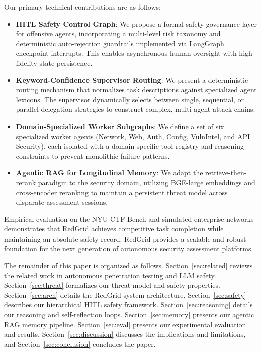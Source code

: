 \documentclass[conference,compsoc]{IEEEtran}
\begin{document}
Our primary technical contributions are as follows:
\begin{itemize}
    \item \textbf{HITL Safety Control Graph}: We propose a formal safety governance layer for offensive agents, incorporating a multi-level risk taxonomy and deterministic auto-rejection guardrails implemented via LangGraph checkpoint interrupts. This enables asynchronous human oversight with high-fidelity state persistence.
    
    \item \textbf{Keyword-Confidence Supervisor Routing}: We present a deterministic routing mechanism that normalizes task descriptions against specialized agent lexicons. The supervisor dynamically selects between single, sequential, or parallel delegation strategies to construct complex, multi-agent attack chains.

    \item \textbf{Domain-Specialized Worker Subgraphs}: We define a set of six specialized worker agents (Network, Web, Auth, Config, VulnIntel, and API Security), each isolated with a domain-specific tool registry and reasoning constraints to prevent monolithic failure patterns.

    \item \textbf{Agentic RAG for Longitudinal Memory}: We adapt the retrieve-then-rerank paradigm to the security domain, utilizing BGE-large embeddings and cross-encoder reranking to maintain a persistent threat model across disparate assessment sessions.
\end{itemize}

Empirical evaluation on the NYU CTF Bench and simulated enterprise networks demonstrates that RedGrid achieves competitive task completion while maintaining an absolute safety record. RedGrid provides a scalable and robust foundation for the next generation of autonomous security assessment platforms.

The remainder of this paper is organized as follows. Section~\ref{sec:related} reviews the related work in autonomous penetration testing and LLM safety. Section~\ref{sec:threat} formalizes our threat model and safety properties. Section~\ref{sec:arch} details the RedGrid system architecture. Section~\ref{sec:safety} describes our hierarchical HITL safety framework. Section~\ref{sec:reasoning} details our reasoning and self-reflection loops. Section~\ref{sec:memory} presents our agentic RAG memory pipeline. Section~\ref{sec:eval} presents our experimental evaluation and results. Section~\ref{sec:discussion} discusses the implications and limitations, and Section~\ref{sec:conclusion} concludes the paper.
\end{document}
